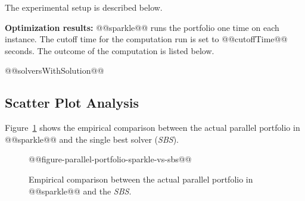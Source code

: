 \documentclass[british]{article}
\newif\ifdes
\begin{document}
The experimental setup is described below.

\ifdes \textbf{Performance computation:} @@sparkle@@ runs the portfolio one time on each instance. The cutoff time for the computation run is set to @@cutoffTime@@ seconds. The outcome of the computation is listed below. The scores of the outcomes are calculated according to PAR10, this means that for each instance the solver which solved the instance is scored its runtime and the remaining solvers are scored the runtime times ten. If however the porfolio reaches the cutofftime, which means that no solvers solved the instance, all solvers are scored the cutofftime times ten.
\else \textbf{Optimization results:} @@sparkle@@ runs the portfolio one time on each instance. The cutoff time for the computation run is set to @@cutoffTime@@ seconds. The outcome of the computation is listed below. \fi

\begin{enumerate}
@@solversWithSolution@@
\end{enumerate}

\subsection{Scatter Plot Analysis}
\label{sec:Scatter_Plot_Analysis}

Figure~\ref{fig:sparkle_vs_sbs} shows the empirical comparison between the actual parallel portfolio in @@sparkle@@ and the single best solver (\emph{SBS}).

% 

\begin{figure}[htbp]
\noindent \begin{centering}
    @@figure-parallel-portfolio-sparkle-vs-sbs@@
\par\end{centering}

\caption{Empirical comparison between the actual parallel portfolio in @@sparkle@@ and the \emph{SBS}.}\label{fig:sparkle_vs_sbs}
\end{figure}



\end{document}
